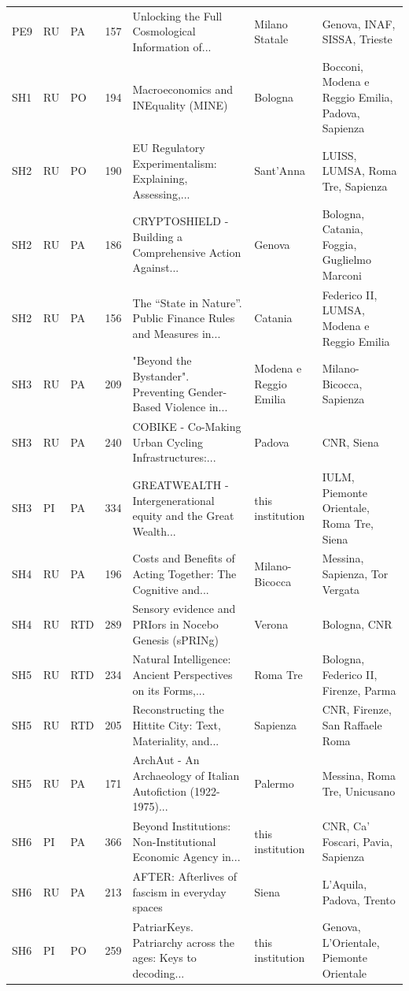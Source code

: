 \documentclass[11pt,a4paper]{article}
\begin{document}
{\begin{longtable}{lllrp{4.2cm}p{2cm}p{3.2cm}}
PE9 & RU & PA & 157 & Unlocking the Full Cosmological Information of... & Milano Statale & Genova, INAF, SISSA, Trieste \\
SH1 & RU & PO & 194 & Macroeconomics and INEquality (MINE) & Bologna & Bocconi, Modena e Reggio Emilia, Padova, Sapienza \\
SH2 & RU & PO & 190 & EU Regulatory Experimentalism: Explaining, Assessing,... & Sant'Anna & LUISS, LUMSA, Roma Tre, Sapienza \\
SH2 & RU & PA & 186 & CRYPTOSHIELD - Building a Comprehensive Action Against... & Genova & Bologna, Catania, Foggia, Guglielmo Marconi \\
SH2 & RU & PA & 156 & The “State in Nature”. Public Finance Rules and Measures in... & Catania & Federico II, LUMSA, Modena e Reggio Emilia \\
SH3 & RU & PA & 209 & "Beyond the Bystander". Preventing Gender-Based Violence in... & Modena e Reggio Emilia & Milano-Bicocca, Sapienza \\
SH3 & RU & PA & 240 & COBIKE - Co-Making Urban Cycling Infrastructures:... & Padova & CNR, Siena \\
SH3 & PI & PA & 334 & GREATWEALTH - Intergenerational equity and the Great Wealth... & this institution & IULM, Piemonte Orientale, Roma Tre, Siena \\
SH4 & RU & PA & 196 & Costs and Benefits of Acting Together: The Cognitive and... & Milano-Bicocca & Messina, Sapienza, Tor Vergata \\
SH4 & RU & RTD & 289 & Sensory evidence and PRIors in Nocebo Genesis (sPRINg) & Verona & Bologna, CNR \\
SH5 & RU & RTD & 234 & Natural Intelligence: Ancient Perspectives on its Forms,... & Roma Tre & Bologna, Federico II, Firenze, Parma \\
SH5 & RU & RTD & 205 & Reconstructing the Hittite City: Text, Materiality, and... & Sapienza & CNR, Firenze, San Raffaele Roma \\
SH5 & RU & PA & 171 & ArchAut - An Archaeology of Italian Autofiction (1922-1975)... & Palermo & Messina, Roma Tre, Unicusano \\
SH6 & PI & PA & 366 & Beyond Institutions: Non-Institutional Economic Agency in... & this institution & CNR, Ca' Foscari, Pavia, Sapienza \\
SH6 & RU & PA & 213 & AFTER: Afterlives of fascism in everyday spaces & Siena & L'Aquila, Padova, Trento \\
SH6 & PI & PO & 259 & PatriarKeys. Patriarchy across the ages: Keys to decoding... & this institution & Genova, L'Orientale, Piemonte Orientale \\

\end{longtable}}
\end{document}
